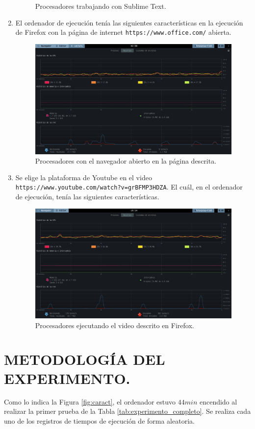 \documentclass[11pt,a4paper]{article}
\begin{document}
\begin{enumerate}
\begin{figure}[hbt!]
			\caption{Procesadores trabajando con Sublime Text.}
			\label{fig:subl}
		\end{figure}
	\item[\fbox{Página Web}] El ordenador de ejecución tenía las siguientes características en la ejecución de Firefox con la página de internet \texttt{https://www.office.com/} abierta.
		\begin{figure}[hbt!]
			\centering
			\includegraphics[width= 0.8 \linewidth]{IMAGENES/6/6_firefox_web}
			\caption{Procesadores con el navegador abierto en la página descrita.}
			\label{fig:firefox_1}
		\end{figure}
	\item[\fbox{Video Web}] Se elige la plataforma de Youtube en el video \texttt{https://www.youtube.com/watch?v=grBFMP3HDZA}.
		El cuál, en el ordenador de ejecución, tenía las siguientes características.
		\begin{figure}[hbt!]
			\centering
			\includegraphics[width= 0.8 \linewidth]{IMAGENES/6/8_firefox_video}
			\caption{Procesadores ejecutando el video descrito en Firefox.}
			\label{fig:video}
		\end{figure}
\end{enumerate}


\section{METODOLOGÍA DEL EXPERIMENTO.} %
Como lo indica la Figura \ref{fig:caract}, el ordenador estuvo \(44min\) encendido al realizar la primer prueba de la Tabla \ref{tab:experimento_completo}.
Se realiza cada uno de los registros de tiempos de ejecución de forma aleatoria. \\[2mm]
\end{document}
